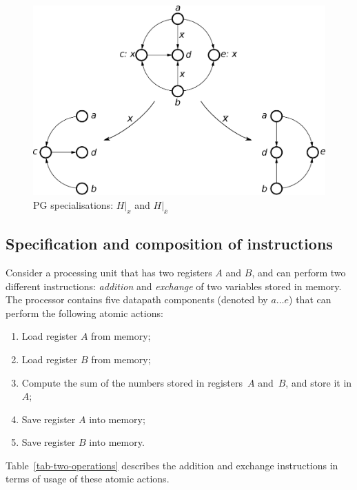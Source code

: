 \begin{figure}
\begin{centering}
\includegraphics[width=1\columnwidth]{fig/cpog_projections_2}
\par\end{centering}

\caption{\label{fig:Specialisations}PG specialisations: $H\vert_{x}$ and
$H\vert_{\overline{x}}$}
\end{figure}



\subsection{Specification and composition of instructions}

Consider a processing unit that has two registers $A$ and $B$, and
can perform two different instructions: \emph{addition} and \emph{exchange}
of two variables stored in memory. The processor contains five datapath
components (denoted by $a\dots e$) that can perform the following
atomic actions:\renewcommand{\labelenumi}{\alph{enumi})}
\begin{enumerate}
\item Load register $A$ from memory;
\item Load register $B$ from memory;
\item Compute the sum of the numbers stored in registers~$A$ and~$B$,
and store it in $A$;
\item Save register $A$ into memory;
\item Save register $B$ into memory.
\end{enumerate}
\renewcommand{\labelenumi}{\arabic{enumi}.}Table~\ref{tab-two-operations}
describes the addition and exchange instructions in terms of usage
of these atomic actions.


